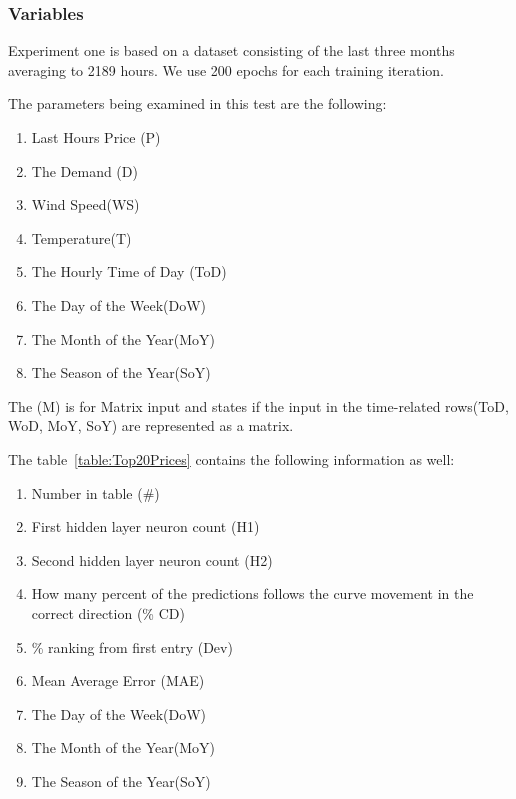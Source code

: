 \subsubsection{Variables}
Experiment one is based on a dataset consisting of the last three months averaging to 2189 hours. We use 200 epochs for each training iteration.

The parameters being examined in this test are the following:
\begin{enumerate}
	\item Last Hours Price (P)
	\item The Demand (D)
	\item Wind Speed(WS)
	\item Temperature(T)
	\item The Hourly Time of Day (ToD)
	\item The Day of the Week(DoW)
	\item The Month of the Year(MoY)
	\item The Season of the Year(SoY)
\end{enumerate}

The (M) is for Matrix input and states if the input in the time-related rows(ToD, WoD, MoY, SoY) are represented as a matrix.

The table~\ref{table:Top20Prices} contains the following information as well:
\begin{enumerate}
	\item Number in table (\#)
	\item First hidden layer neuron count (H1)
	\item Second hidden layer neuron count (H2)
	\item How many percent of the predictions follows the curve movement in the correct direction (\% CD)
	\item \% ranking from first entry (Dev)
	\item Mean Average Error (MAE)
	\item The Day of the Week(DoW)
	\item The Month of the Year(MoY)
	\item The Season of the Year(SoY)
\end{enumerate}

